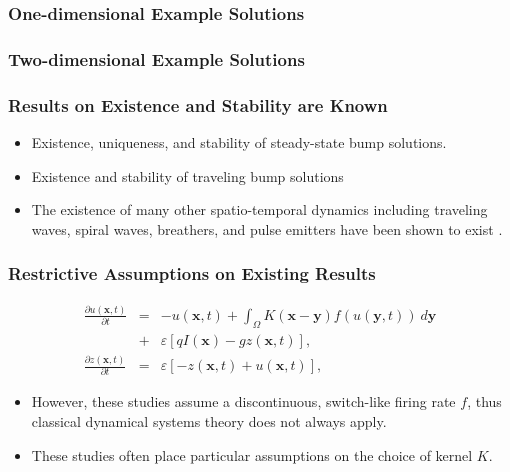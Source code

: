 \documentclass{beamer}
\newcommand{\x}{\mathbf{x}}
\newcommand{\y}{\mathbf{y}}
\newcommand{\io}{\int_\Omega}
\newcommand{\ve}{\varepsilon}
\begin{document}
\begin{frame}
\frametitle{One-dimensional Example Solutions}
\begin{center}
\end{center}
\end{frame}


\begin{frame}
\frametitle{Two-dimensional Example Solutions}
\begin{center}
\end{center}
\end{frame}


\begin{frame}
 \frametitle{Results on Existence and Stability are Known}
 \begin{itemize}
  \item Existence, uniqueness, and stability of steady-state bump solutions. \cite{zhang_neural_2012,pinto_ermentrout_2001_siam}
  \item Existence and stability of traveling bump solutions \cite{kilpatrick_effects_2010,fung_spontaneous_2015}
  \item The existence of many other spatio-temporal dynamics including traveling waves, spiral waves, breathers, and pulse emitters have been shown to exist \cite{bressloff_etal_2003_prl,folias_bressloff_2004_siam,folias_bressloff_2005_prl,folias_bressloff_2005_siam,folias_bressloff_2005_prl,folias2017traveling,kilpatrick_effects_2010,kilpatrick_spatially_2009,bressloff_folias_2004_siam,bressloff_etal_2003_prl,kilpatrick_spatially_2009}.
 \end{itemize}
\end{frame}

\begin{frame}
 \frametitle{Restrictive Assumptions on Existing Results}
 \begin{eqnarray*}
\frac{\partial u(\x,t)}{\partial t} &=& -u(\x,t) + \io K(\x-\y) f(u(\y,t))\ d\y  \\
{} &+& \ve[q I(\x) - g z(\x,t)] \nonumber, \\
\frac{\partial z(\x,t)}{\partial t} &=& \ve [-z(\x,t)+u(\x,t)],
\end{eqnarray*}
 \begin{itemize}
  \item However, these studies assume a discontinuous, switch-like firing rate $f$, thus classical dynamical systems theory does not always apply.
  \item These studies often place particular assumptions on the choice of kernel $K$.
 \end{itemize}
\end{frame}
\end{document}
